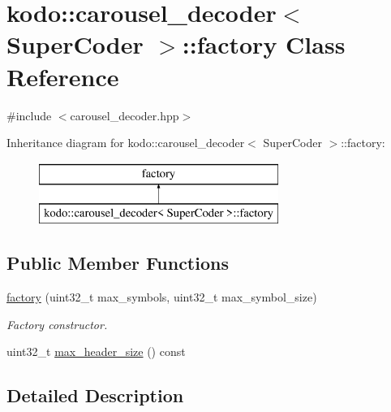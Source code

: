 \hypertarget{classkodo_1_1carousel__decoder_1_1factory}{\section{kodo\-:\-:carousel\-\_\-decoder$<$ Super\-Coder $>$\-:\-:factory Class Reference}
\label{classkodo_1_1carousel__decoder_1_1factory}
}


{\ttfamily \#include $<$carousel\-\_\-decoder.\-hpp$>$}

Inheritance diagram for kodo\-:\-:carousel\-\_\-decoder$<$ Super\-Coder $>$\-:\-:factory\-:\begin{figure}[H]
\begin{center}
\leavevmode
\includegraphics[height=2.000000cm]{classkodo_1_1carousel__decoder_1_1factory}
\end{center}
\end{figure}
\subsection*{Public Member Functions}
\begin{DoxyCompactItemize}
\item 
\hyperlink{classkodo_1_1carousel__decoder_1_1factory_a20d4753eea23aec45de78fba5ad5f55b}{factory} (uint32\-\_\-t max\-\_\-symbols, uint32\-\_\-t max\-\_\-symbol\-\_\-size)
\begin{DoxyCompactList}\small\item\em Factory constructor. \end{DoxyCompactList}\item 
uint32\-\_\-t \hyperlink{classkodo_1_1carousel__decoder_1_1factory_af0d764e395953a38fa537d23d0c761ef}{max\-\_\-header\-\_\-size} () const 
\begin{DoxyCompactList}\small\item\em \end{DoxyCompactList}\end{DoxyCompactItemize}


\subsection{Detailed Description}
